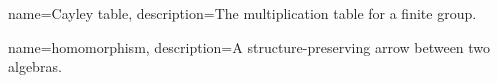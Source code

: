 {
  name={Cayley table},
  description={The multiplication table for a finite group.}
}

{
  name={homomorphism},
  description={A structure-preserving arrow between two algebras.}
}
